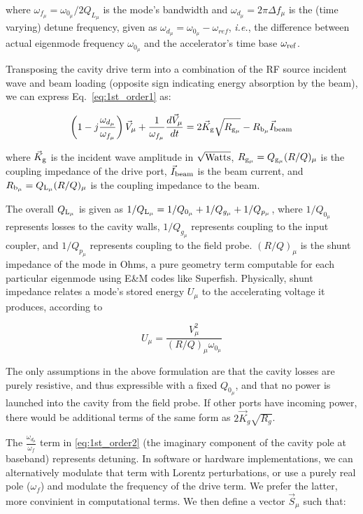 \documentclass[a4paper,12pt]{article}
\begin{document}
\noindent where $\omega_{f_{\mu}}=\omega_{0_{\mu}}/2Q_{L_{\mu}}$ is the mode's bandwidth and $\omega_{d_{\mu}}=2\pi\Delta f_{\mu}$ is the (time varying) detune frequency, given as $\omega_{d_{\mu}}=\omega_{0_{\mu}}-\omega_{ref}$, {\it i.e.}, the difference between actual eigenmode frequency $\omega_{0_{\mu}}$ and the accelerator's time base $\omega_{\rm ref}$.

Transposing the cavity drive term into a combination of the RF source incident wave and beam loading (opposite sign indicating energy absorption by the beam), we can express Eq.~\ref{eq:1st_order1} as:

\begin{equation}
  \left(1-j\frac{\omega_{d_{\mu}}}{\omega_{f_{\mu}}}\right)\vec V_{\mu} + {\frac{1}{\omega_{f_{\mu}}}}\frac{d\vec V_{\mu}}{dt} =  2\vec K_{\rm g}\sqrt{R_{\rm g_{\mu}}} - R_{\rm b_{\mu}}\vec I_{\rm beam}
  \label{eq:1st_order2}
\end{equation}

\noindent where $\vec K_{\rm g}$ is the incident wave amplitude in $\sqrt{\rm Watts}$, $R_{\rm g_{\mu}}=Q_{\rm g_{\mu}}(R/Q)_{\mu}$ is the coupling impedance of the drive port, $\vec I_{\rm beam}$ is the beam current, and $R_{\rm b_{\mu}}=Q_{\rm L_{\mu}}(R/Q)_{\mu}$ is the coupling impedance to the beam.

The overall $Q_{\rm L_{\mu}}$ is given as $1/Q_{\rm L_{\mu}}=1/Q_{0_{\mu}}+1/Q_{g_{\mu}}+1/Q_{p_{\mu}}$, where $1/Q_{0_{\mu}}$ represents losses to the cavity walls, $1/Q_{g_{\mu}}$ represents coupling to the input coupler, and $1/Q_{p_{\mu}}$ represents coupling to the field probe. $(R/Q)_{\mu}$ is the shunt impedance of the mode in Ohms, a pure geometry term computable for each particular eigenmode using E\&M codes like Superfish. Physically, shunt impedance relates a mode's stored energy $U_{\mu}$ to the accelerating voltage it produces, according to

\begin{equation}
  U_{\mu} = \frac{V_{\mu}^2}{(R/Q)_{\mu}\omega_{0_{\mu}}}
\end{equation}

The only assumptions in the above formulation are that the cavity losses are purely resistive, and thus expressible with a fixed $Q_{0_{\mu}}$, and that no power is launched into the cavity from the field probe.  If other ports have incoming power, there would be additional terms of the same form as $2\vec K_g\sqrt{R_g}$.

The $\frac{\omega_{d_\mu}}{\omega_{f}}$ term in \ref{eq:1st_order2} (the imaginary component of the cavity pole at baseband) represents detuning. In software or hardware implementations, we can alternatively modulate that term with Lorentz perturbations, or use a purely real pole ($\omega_f$) and modulate the frequency of the drive term. We prefer the latter, more convinient in computational terms. We then define a vector $\vec{S}_{\mu}$ such that:
\end{document}
